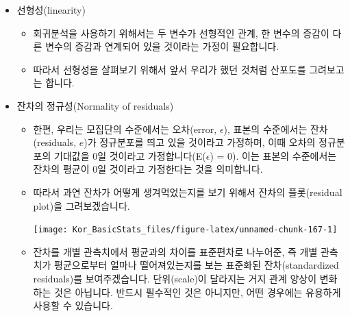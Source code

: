 \documentclass[]{book}
\newenvironment{Shaded}{\begin{snugshade}}{\end{snugshade}}
\newcommand{\DataTypeTok}[1]{\textcolor[rgb]{0.13,0.29,0.53}{#1}}
\newcommand{\DecValTok}[1]{\textcolor[rgb]{0.00,0.00,0.81}{#1}}
\newcommand{\KeywordTok}[1]{\textcolor[rgb]{0.13,0.29,0.53}{\textbf{#1}}}
\newcommand{\NormalTok}[1]{#1}
\newcommand{\OperatorTok}[1]{\textcolor[rgb]{0.81,0.36,0.00}{\textbf{#1}}}
\providecommand{\tightlist}{%
  \setlength{\itemsep}{0pt}\setlength{\parskip}{0pt}}
\begin{document}
\begin{itemize}
\item
  선형성(linearity)

  \begin{itemize}
  \tightlist
  \item
    회귀분석을 사용하기 위해서는 두 변수가 선형적인 관계, 한 변수의 증감이 다른 변수의 증감과 연계되어 있을 것이라는 가정이 필요합니다.
  \item
    따라서 선형성을 살펴보기 위해서 앞서 우리가 했던 것처럼 산포도를 그려보고는 합니다.
  \end{itemize}
\item
  잔차의 정규성(Normality of residuals)

  \begin{itemize}
  \item
    한편, 우리는 모집단의 수준에서는 오차(error, \(\epsilon\)), 표본의 수준에서는 잔차(residuals, \(e\))가 정규분포를 띄고 있을 것이라고 가정하며, 이때 오차의 정규분포의 기대값을 0일 것이라고 가정합니다(E(\(\epsilon\)) = 0). 이는 표본의 수준에서는 잔차의 평균이 0일 것이라고 가정한다는 것을 의미합니다.
  \item
    따라서 과연 잔차가 어떻게 생겨먹었는지를 보기 위해서 잔차의 플롯(residual plot)을 그려보겠습니다.

\begin{Shaded}
\end{Shaded}

    \begin{center}\texttt{[image: Kor\_BasicStats\_files/figure-latex/unnamed-chunk-167-1]} \end{center}
  \item
    잔차를 개별 관측치에서 평균과의 차이를 표준편차로 나누어준, 즉 개별 관측치가 평균으로부터 얼마나 떨어져있는지를 보는 표준화된 잔차(standardized residuals)를 보여주겠습니다. 단위(scale)이 달라지는 거지 관계 양상이 변화하는 것은 아닙니다. 반드시 필수적인 것은 아니지만, 어떤 경우에는 유용하게 사용할 수 있습니다.


\end{itemize}
\end{itemize}
\end{document}
